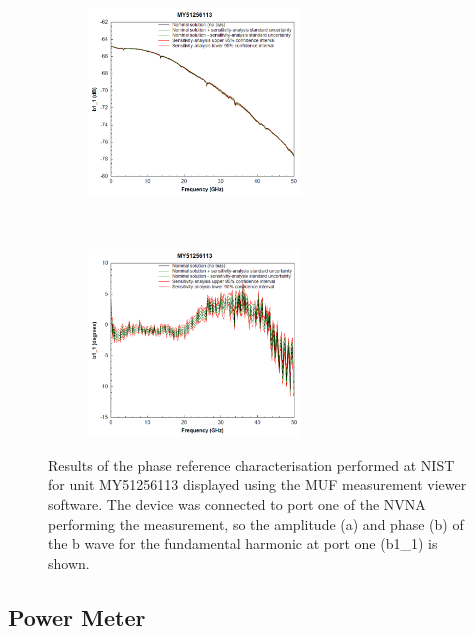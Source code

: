\documentclass[../thesis/thesis.tex]{subfiles}
\begin{document}
\begin{figure}
	\centering
	\begin{subfigure}{\textwidth}
		\centering
		\includegraphics[width=0.62\textwidth]{combuncA.png}
		\caption{ }
	\end{subfigure}
	\\
	\begin{subfigure}{\textwidth}
		\centering
		\includegraphics[width=0.62\textwidth]{combuncP.png}
		\caption{ }
	\end{subfigure}
	\caption[Results of the phase reference characterisation performed at NIST for unit MY51256113 displayed using the MUF measurement viewer software.]{Results of the phase reference characterisation performed at NIST for unit MY51256113 displayed using the MUF measurement viewer software. The device was connected to port one of the NVNA performing the measurement, so the amplitude (a) and phase (b) of the b wave for the fundamental harmonic at port one (b1\_1) is shown.}
	\label{ch4_fig_combunc}
\end{figure}

\subsection{Power Meter}
\end{document}
